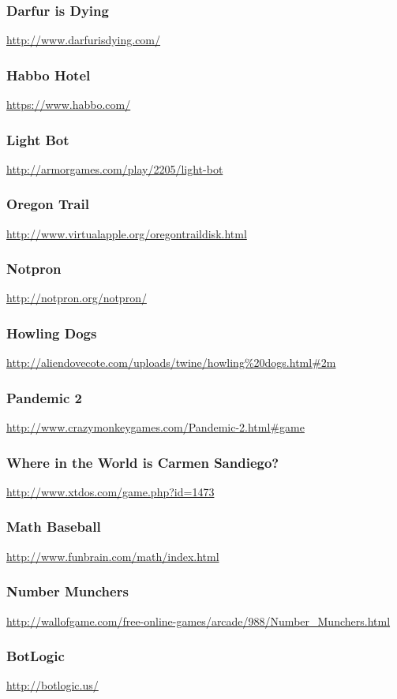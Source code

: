 \subsubsection{Darfur is Dying}\url{http://www.darfurisdying.com/}\subsubsection{Habbo Hotel}\url{https://www.habbo.com/}\subsubsection{Light Bot}\url{http://armorgames.com/play/2205/light-bot}\subsubsection{Oregon Trail}\url{http://www.virtualapple.org/oregontraildisk.html}\subsubsection{Notpron}\url{http://notpron.org/notpron/}\subsubsection{Howling Dogs}\url{http://aliendovecote.com/uploads/twine/howling%20dogs.html#2m}\subsubsection{Pandemic 2}\url{http://www.crazymonkeygames.com/Pandemic-2.html#game}\subsubsection{Where in the World is Carmen Sandiego?}\url{http://www.xtdos.com/game.php?id=1473}\subsubsection{Math Baseball}\url{http://www.funbrain.com/math/index.html}\subsubsection{Number Munchers}\url{http://wallofgame.com/free-online-games/arcade/988/Number_Munchers.html}\subsubsection{BotLogic}\url{http://botlogic.us/}